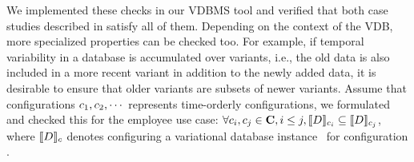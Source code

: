 \noindent
%
We implemented these checks in our VDBMS tool and verified that both case
studies described in  satisfy all of them. 
%
Depending on the context of the VDB, 
more specialized properties can be checked too. For example, if temporal 
variability in a database is accumulated over variants, i.e., the old data
is also included in a more recent variant in addition to the newly added data,
it is desirable
to ensure that older variants are subsets of newer variants. 
Assume that configurations \ensuremath{\config_1, \config_2, \cdots}
represents time-orderly configurations, we formulated
and checked this for the employee use case:
\ensuremath{
\forall \config_i, \config_j \in \confSet, i \le j, \sem[\config_i] {\vDB} \subseteq \sem[\config_j]{\vDB}
}, 
where \ensuremath{\sem[\config]{\vDB}} denotes configuring a variational database instance
\vDB\ for configuration \config. 


